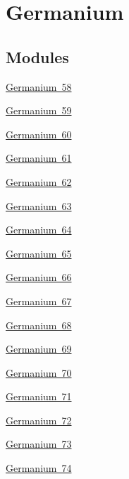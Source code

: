 \hypertarget{group___isotope_const-_germanium}{}\section{Germanium}
\label{group___isotope_const-_germanium}
\subsection*{Modules}
\begin{DoxyCompactItemize}
\item 
\mbox{\hyperlink{group___isotope_const-_germanium-_ge58}{Germanium 58}}
\item 
\mbox{\hyperlink{group___isotope_const-_germanium-_ge59}{Germanium 59}}
\item 
\mbox{\hyperlink{group___isotope_const-_germanium-_ge60}{Germanium 60}}
\item 
\mbox{\hyperlink{group___isotope_const-_germanium-_ge61}{Germanium 61}}
\item 
\mbox{\hyperlink{group___isotope_const-_germanium-_ge62}{Germanium 62}}
\item 
\mbox{\hyperlink{group___isotope_const-_germanium-_ge63}{Germanium 63}}
\item 
\mbox{\hyperlink{group___isotope_const-_germanium-_ge64}{Germanium 64}}
\item 
\mbox{\hyperlink{group___isotope_const-_germanium-_ge65}{Germanium 65}}
\item 
\mbox{\hyperlink{group___isotope_const-_germanium-_ge66}{Germanium 66}}
\item 
\mbox{\hyperlink{group___isotope_const-_germanium-_ge67}{Germanium 67}}
\item 
\mbox{\hyperlink{group___isotope_const-_germanium-_ge68}{Germanium 68}}
\item 
\mbox{\hyperlink{group___isotope_const-_germanium-_ge69}{Germanium 69}}
\item 
\mbox{\hyperlink{group___isotope_const-_germanium-_ge70}{Germanium 70}}
\item 
\mbox{\hyperlink{group___isotope_const-_germanium-_ge71}{Germanium 71}}
\item 
\mbox{\hyperlink{group___isotope_const-_germanium-_ge72}{Germanium 72}}
\item 
\mbox{\hyperlink{group___isotope_const-_germanium-_ge73}{Germanium 73}}
\item 
\mbox{\hyperlink{group___isotope_const-_germanium-_ge74}{Germanium 74}}
\item 

\end{DoxyCompactItemize}
